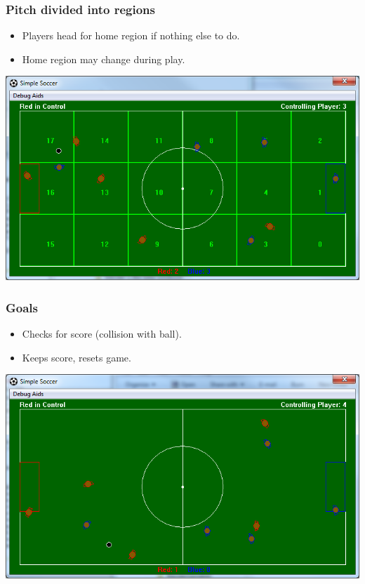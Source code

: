 \documentclass[handout,t,compress]{beamer}
\newcommand{\bframe}[1]{\begin{frame}[fragile]\frametitle{{#1}}}
\begin{document}
\bframe{Pitch divided into regions}
\begin{itemize}
\item Players head for home region if nothing else to do.
\item Home region may change during play.
\end{itemize}
\includegraphics[scale=0.4]{simplesoccerregions.png}
\end{frame}

\bframe{Goals}
\begin{itemize}
\item Checks for score (collision with ball).
\item Keeps score, resets game.
\end{itemize}
\includegraphics[scale=0.4]{simplesoccergame.png}
\end{frame}
\end{document}
